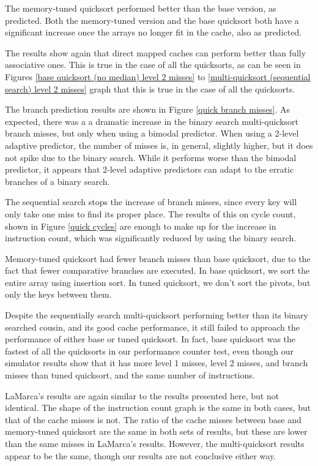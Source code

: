 The memory-tuned quicksort performed better than the base version, as predicted.
Both the memory-tuned version and the base quicksort both have a significant
increase once the arrays no longer fit in the cache, also as predicted.

The results show again that direct mapped caches can perform better than fully
associative ones. This is true in the case of all the quicksorts, as can be seen
in Figures \ref{base quicksort (no median) level 2 misses} to
\ref{multi-quicksort (sequential search) level 2 misses} graph that this is true
in the case of all the quicksorts.

The branch prediction results are shown in Figure \ref{quick branch misses}. As
expected, there was a a dramatic increase in the binary search multi-quicksort
branch misses, but only when using a bimodal predictor. When using a 2-level
adaptive predictor, the number of misses is, in general, slightly higher, but it
does not spike due to the binary search. While it performs worse than the
bimodal predictor, it appears that 2-level adaptive predictors can adapt to the
erratic branches of a binary search.

The sequential search stops the increase of branch misses, since every key will
only take one miss to find its proper place. The results of this on cycle
count, shown in Figure \ref{quick cycles} are enough to make up for the increase
in instruction count, which was significantly reduced by using the binary
search.

Memory-tuned quicksort had fewer branch misses than base quicksort, due to the fact
that fewer comparative branches are executed. In base quicksort, we sort the
entire array using insertion sort. In tuned quicksort, we don't sort the pivots,
but only the keys between them.

Despite the sequentially search multi-quicksort performing better than its
binary searched cousin, and its good cache performance, it still failed to
approach the performance of either base or tuned quicksort. In fact, base
quicksort was the fastest of all the quicksorts in our performance counter test,
even though our simulator results show that it has more level 1 misses, level 2
misses, and branch misses than tuned quicksort, and the same number of
instructions.

LaMarca's results are again similar to the results presented here, but not
identical. The shape of the instruction count graph is the same in both cases,
but that of the cache misses is not. The ratio of the cache misses between base
and memory-tuned quicksort are the same in both sets of results, but these are lower
than the same misses in LaMarca's results. However, the multi-quicksort results
appear to be the same, though our results are not conclusive either way.


